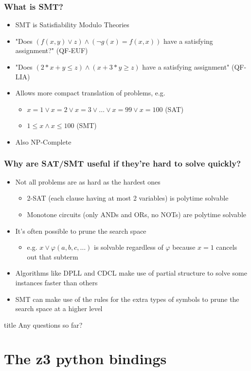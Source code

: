 \documentclass[aspectratio=169]{beamer}
\newcommand{\questionsslide}[1]{
  \begin{frame}
  \vfill
  \centering
  \begin{beamercolorbox}[sep=8pt,center,shadow=true,rounded=true]{title}
    \usebeamerfont{title}Any questions#1?\par%
  \end{beamercolorbox}
  \vfill
  \end{frame}
}
\begin{document}
\begin{frame}[fragile]
\frametitle{What is SMT?}
\begin{itemize}
\item SMT is Satisfiability Modulo Theories
\item "Does $(f(x,y) \lor z) \land (\neg g(x) = f(x, x))$ have a satisfying assignment?" (QF-EUF)
\item "Does $(2*x+y \le z) \land (x+3*y \ge z)$ have a satisfying assignment" (QF-LIA)
\item Allows more compact translation of problems, e.g.
\begin{itemize}
\item $x = 1 \lor x = 2 \lor x = 3 \lor \hdots \lor x = 99 \lor x = 100$ (SAT)
\item $1 \le x \land x \le 100$ (SMT)
\end{itemize}
\item Also NP-Complete
\end{itemize}
\end{frame}

\begin{frame}[fragile]
\frametitle{Why are SAT/SMT useful if they're hard to solve quickly?}
\begin{itemize}
\item Not all problems are as hard as the hardest ones
\begin{itemize}
\item 2-SAT (each clause having at most 2 variables) is polytime solvable
\item Monotone circuits (only ANDs and ORs, no NOTs) are polytime solvable
\end{itemize}
\item It's often possible to prune the search space 
\begin{itemize}
\item e.g. $x \lor \varphi(a, b, c, \hdots)$ is solvable regardless of $\varphi$ because $x=1$ cancels out that subterm
\end{itemize}
\item Algorithms like DPLL and CDCL make use of partial structure to solve some instances faster than others
\item SMT can make use of the rules for the extra types of symbols to prune the search space at a higher level
\end{itemize}
\end{frame}

\questionsslide{ so far}
\section{The z3 python bindings}
\end{document}
